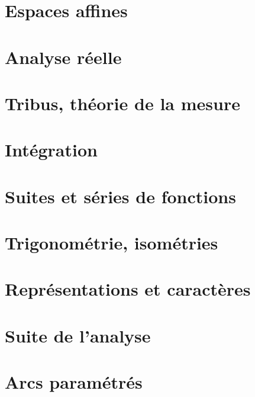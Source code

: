\documentclass[a4paper,twoside,11pt]{book}
\begin{document}
\chapter{Espaces affines}


\chapter{Analyse réelle}










\chapter{Tribus, théorie de la mesure}






\chapter{Intégration}






\chapter{Suites et séries de fonctions}



\chapter{Trigonométrie, isométries}





\chapter{Représentations et caractères}


\chapter{Suite de l'analyse}





\chapter{Arcs paramétrés}


\end{document}
